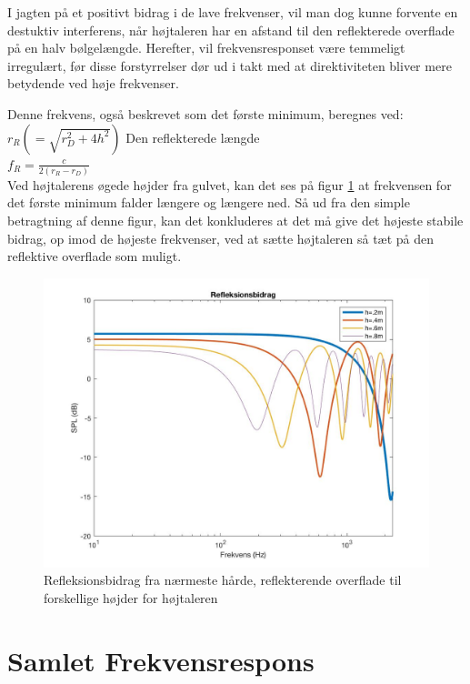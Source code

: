 I jagten på et positivt bidrag i de lave frekvenser, vil man dog kunne forvente en destuktiv interferens, når højtaleren har en afstand til den reflekterede overflade på en halv bølgelængde. Herefter, vil frekvensresponset være temmeligt irregulært, før disse forstyrrelser dør ud i takt med at direktiviteten bliver mere betydende ved høje frekvenser. 

Denne frekvens, også beskrevet som det første minimum, beregnes ved:\\

\(r_R(=\sqrt{r_D^2+4h^2})\) \hspace{2cm}Den reflekterede længde\\
\(f_R=\frac{c}{2(r_R-r_D)}\)\\

Ved højtalerens øgede højder fra gulvet, kan det ses på figur \ref{fig:refleksionsbidrag} at frekvensen for det første minimum falder længere og længere ned. Så ud fra den simple betragtning af denne figur, kan det konkluderes at det må give det højeste stabile bidrag, op imod de højeste frekvenser, ved at sætte højtaleren så tæt på den reflektive overflade som muligt.

\begin{figure}[h!]
	\centering
	\includegraphics[width=\textwidth]{Pics/refleksionsbidrag}
	\caption{Refleksionsbidrag fra nærmeste hårde, reflekterende overflade til forskellige højder for højtaleren } 
	\label{fig:refleksionsbidrag}
\end{figure}

\section{Samlet Frekvensrespons}

